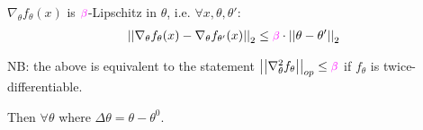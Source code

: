 \documentclass[11pt]{article}
\begin{document}
\begin{definition}
	 $\nabla_{\theta} f_{\theta}(x)$ is $\mpink \beta$-Lipschitz in $\theta$, i.e. $\forall x, \theta, \theta'$:
	\begin{align}
		\norm{  \nabla_{\theta} f_{\theta}(x) - \nabla_{\theta} f_{\theta'}(x)  } \leq\mpink \beta \cdot \norm{\theta - \theta'}
	\end{align}

	NB: the above is equivalent to the statement $\norm[op]{\nabla^2_{\theta} f_{\theta}} \leq \mpink\beta$ if $f_{\theta}$ is twice-differentiable.

	Then $\forall \theta$
	where $\Delta\theta = \theta - \theta^0$. 
\end{definition}
\end{document}
